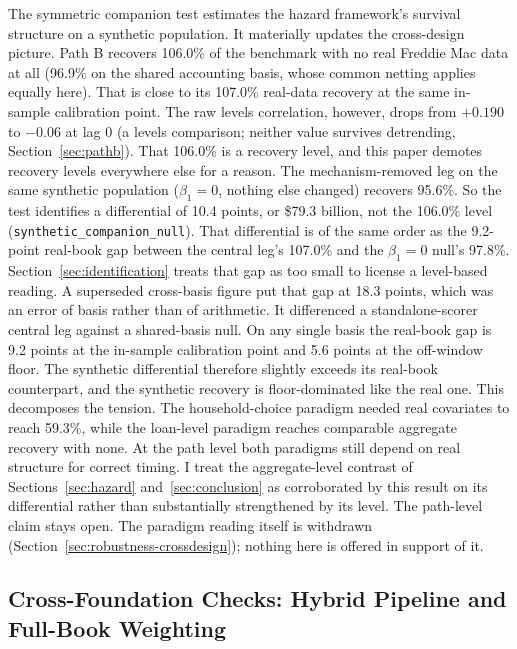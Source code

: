 \documentclass[12pt]{article}
\begin{document}
The symmetric companion test estimates the hazard framework's survival structure on a synthetic population. It materially updates the cross-design picture. Path B recovers 106.0\% of the benchmark with no real Freddie Mac data at all (96.9\% on the shared accounting basis, whose common netting applies equally here). That is close to its 107.0\% real-data recovery at the same in-sample calibration point. The raw levels correlation, however, drops from $+0.190$ to $-0.06$ at lag 0 (a levels comparison; neither value survives detrending, Section~\ref{sec:pathb}). That 106.0\% is a recovery level, and this paper demotes recovery levels everywhere else for a reason. The mechanism-removed leg on the same synthetic population ($\beta_1 = 0$, nothing else changed) recovers 95.6\%. So the test identifies a differential of 10.4 points, or \$79.3 billion, not the 106.0\% level (\texttt{synthetic\_companion\_null}). That differential is of the same order as the 9.2-point real-book gap between the central leg's 107.0\% and the $\beta_1 = 0$ null's 97.8\%. Section~\ref{sec:identification} treats that gap as too small to license a level-based reading. A superseded cross-basis figure put that gap at 18.3 points, which was an error of basis rather than of arithmetic. It differenced a standalone-scorer central leg against a shared-basis null. On any single basis the real-book gap is 9.2 points at the in-sample calibration point and 5.6 points at the off-window floor. The synthetic differential therefore slightly exceeds its real-book counterpart, and the synthetic recovery is floor-dominated like the real one. This decomposes the tension. The household-choice paradigm needed real covariates to reach 59.3\%, while the loan-level paradigm reaches comparable aggregate recovery with none. At the path level both paradigms still depend on real structure for correct timing. I treat the aggregate-level contrast of Sections~\ref{sec:hazard} and~\ref{sec:conclusion} as corroborated by this result on its differential rather than substantially strengthened by its level. The path-level claim stays open. The paradigm reading itself is withdrawn (Section~\ref{sec:robustness-crossdesign}); nothing here is offered in support of it.

\subsection{Cross-Foundation Checks: Hybrid Pipeline and Full-Book Weighting}\label{sec:robustness-hybrid}
\end{document}
